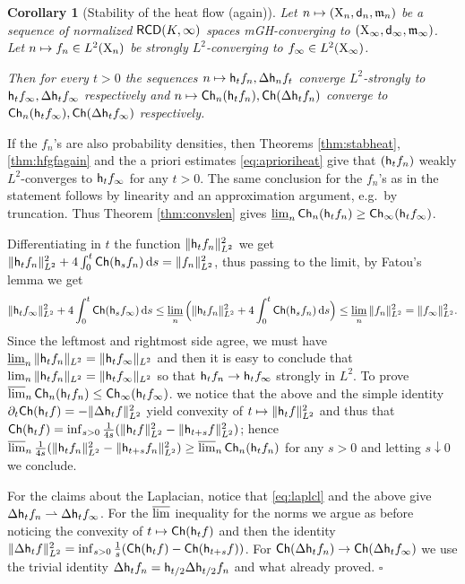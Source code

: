 \documentclass[11pt]{article}
\numberwithin{equation}{section}
\newtheorem{corollary}[theorem]{Corollary}
\newenvironment{idea}{\removelastskip\par\medskip   %
\noindent{\em Idea of the proof} \rm}{\penalty-20\null\hfill$\square$\par\medbreak}
\newcommand{\X}{{\rm X}}
\newcommand{\sfd}{{\sf d}}
\newcommand{\mm}{{\mathfrak m}}
\newcommand{\RCD}{{\sf RCD}}
\newcommand{\ch}{{\sf Ch}}
\renewcommand{\d}{{\rm d}}
\newcommand{\lims}{\varlimsup}
\newcommand{\limi}{\varliminf}
\newcommand{\weakto}{\rightharpoonup}
\newcommand{\h}{{\sf h}} %
\begin{document}
\begin{corollary}[Stability of the heat flow (again)]\label{cor:stabhagain} Let $n\mapsto (\X_n,\sfd_n,\mm_n)$ be a sequence of normalized $\RCD(K,\infty)$ spaces mGH-converging to $(\X_\infty,\sfd_\infty,\mm_\infty)$. Let $n\mapsto f_n\in L^2(\X_n)$ be strongly $L^2$-converging to $f_\infty\in L^2(\X_\infty)$.

Then for every $t>0$ the sequences  $n\mapsto \h_tf_n,\Delta\h_nf_t$ converge $L^2$-strongly to $\h_tf_\infty,\Delta\h_tf_\infty$ respectively and  $n\mapsto \ch_n(\h_tf_n),\ch(\Delta\h_tf_n)$ converge to $\ch_n(\h_tf_\infty),\ch(\Delta\h_tf_\infty)$ respectively.
\end{corollary}
\begin{idea} If the $f_n$'s are also probability densities, then Theorems \ref{thm:stabheat}, \ref{thm:hfgfagain} and the a priori estimates \eqref{eq:aprioriheat} give that  $(\h_tf_n)$ weakly $L^2$-converges to $\h_tf_\infty$ for any $t>0$. The same conclusion for the $f_n$'s as in the statement follows by linearity and an approximation argument, e.g.\ by truncation. Thus Theorem \ref{thm:convslen} gives  $\limi_n\ch_n(\h_tf_n)\geq\ch_\infty(\h_tf_\infty)$.

Differentiating in $t$ the function $\|\h_tf_n\|_{L^2}^2$ we get $\|\h_tf_n\|_{L^2}^2+4\int_0^t\ch(\h_sf_n)\,\d s=\|f_n\|_{L^2}^2$, thus passing to the limit, by Fatou's lemma we get
\begin{equation}
\label{eq:perconvh}
\|\h_tf_\infty\|_{L^2}^2+4\int_0^t\ch(\h_sf_\infty)\,\d s\leq\limi_n\Big(\|\h_tf_n\|_{L^2}^2+4\int_0^t\ch(\h_sf_n)\,\d s\Big)\leq \limi_n\|f_n\|_{L^2}^2=\|f_\infty\|_{L^2}^2.
\end{equation}
Since the leftmost and rightmost side agree, we must have $\limi_n\|\h_tf_n\|_{L^2}=\|\h_tf_\infty\|_{L^2}$ and then it is easy to conclude that $\lim_n\|\h_tf_n\|_{L^2}=\|\h_tf_\infty\|_{L^2}$ so that $\h_tf_n\to\h_tf_\infty$ strongly in $L^2$. To prove  $\lims_n\ch_n(\h_tf_n)\leq\ch_\infty(\h_tf_\infty)$.  we notice that the above and the simple identity $\partial_t\ch(\h_tf)=-\|\Delta\h_tf\|^2_{L^2}$ yield convexity of $t\mapsto\|\h_tf\|_{L^2}^2$ and thus that $\ch(\h_tf)=\inf_{s>0}\tfrac1{4s}({\|\h_tf\|_{L^2}^2-\|\h_{t+s}f\|_{L^2}^2})$; hence $\lims_n\tfrac1{4s}({\|\h_tf_n\|_{L^2}^2-\|\h_{t+s}f_n\|_{L^2}^2})\geq\lims_n\ch_n(\h_tf_n)$ for any $s>0$ and letting $s\downarrow0$ we conclude.

For the claims about the Laplacian, notice that  \eqref{eq:laplcl} and the above  give $\Delta\h_tf_n\weakto\Delta\h_tf_\infty$. For  the $\lims$ inequality for the norms we argue as before noticing the convexity of $t\mapsto\ch(\h_tf)$ and then the identity $\|\Delta\h_tf\|^2_{L^2}=\inf_{s>0}\tfrac1s(\ch(\h_t f)-\ch(\h_{t+s}f))$. For $\ch(\Delta\h_tf_n)\to \ch(\Delta\h_tf_\infty)$ we use the trivial identity $\Delta\h_tf_n=\h_{t/2}\Delta\h_{t/2}f_n$ and what already proved.
\end{idea}
\end{document}

